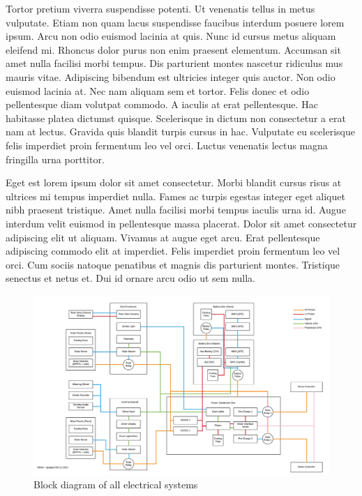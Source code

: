 \documentclass[10pt]{article}
\begin{document}
Tortor pretium viverra suspendisse potenti. Ut venenatis tellus in metus vulputate. Etiam non quam lacus suspendisse faucibus interdum posuere lorem ipsum. Arcu non odio euismod lacinia at quis. Nunc id cursus metus aliquam eleifend mi. Rhoncus dolor purus non enim praesent elementum. Accumsan sit amet nulla facilisi morbi tempus. Dis parturient montes nascetur ridiculus mus mauris vitae. Adipiscing bibendum est ultricies integer quis auctor. Non odio euismod lacinia at. Nec nam
aliquam sem et tortor. Felis donec et odio pellentesque diam volutpat commodo. A iaculis at erat pellentesque. Hac habitasse platea dictumst quisque. Scelerisque in dictum non consectetur a erat nam at lectus. Gravida quis blandit turpis cursus in hac. Vulputate eu scelerisque felis imperdiet proin fermentum leo vel orci. Luctus venenatis lectus magna fringilla urna porttitor.

Eget est lorem ipsum dolor sit amet consectetur. Morbi blandit cursus risus at ultrices mi tempus imperdiet nulla. Fames ac turpis egestas integer eget aliquet nibh praesent tristique. Amet nulla facilisi morbi tempus iaculis urna id. Augue interdum velit euismod in pellentesque massa placerat. Dolor sit amet consectetur adipiscing elit ut aliquam. Vivamus at augue eget arcu. Erat pellentesque adipiscing commodo elit at imperdiet. Felis imperdiet proin fermentum leo vel orci. Cum sociis
natoque penatibus et magnis dis parturient montes. Tristique senectus et netus et. Dui id ornare arcu odio ut sem nulla.

\begin{figure}
\centering
\includegraphics[width=\textwidth]{figures/msxii-electrical-full-block-diagram}
\caption{Block diagram of all electrical systems}
\label{fig:msxii-electrical-full-block-diagram}
\end{figure}
\end{document}
